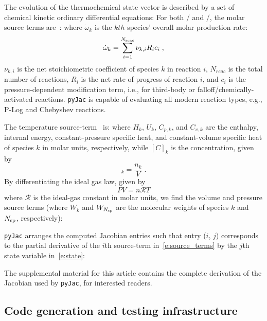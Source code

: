 \documentclass[12pt,number,sort&compress,preprint]{elsarticle}
\begin{document}
The evolution of the thermochemical state vector is described by a set of chemical kinetic ordinary differential equations:
For both \conp/ and \conv/, the molar source terms are~\cite{TurnsStephenR2012Aitc}:
where $\dot{\omega}_k$ is the $kth$ species' overall molar production rate:
\begin{equation}
 \dot{\omega}_{k} = \sum_{i=1}^{\nr/} \nu_{k, i} R_{i} c_{i} \;,
\end{equation}
$\nu_{k, i}$ is the net stoichiometric coefficient of species $k$ in reaction $i$, $N_{reac}$ is the total number of reactions, $R_{i}$ is the net rate of progress of reaction $i$, and $c_{i}$ is the pressure-dependent modification term, i.e., for third-body or falloff\slash chemically-activated reactions.
\texttt{pyJac} is capable of evaluating all modern reaction types, e.g., P-Log and Chebyshev reactions.

The temperature source-term~\cite{TurnsStephenR2012Aitc} is:
where $H_k$, $U_k$, $C_{p,k}$, and $C_{v, k}$ are the enthalpy, internal energy, constant-pressure specific heat, and constant-volume specific heat of species $k$ in molar units, respectively, while $[C]_{k}$ is the concentration, given by
\begin{equation}
 [C]_{k} = \frac{n_{k}}{V} \;.
\end{equation}
By differentiating the ideal gas law, given by
\begin{equation}
 PV = n\mathcal{R}T
\end{equation}
where $\mathcal{R}$ is the ideal-gas constant in molar units, we find the volume and pressure source terms (where $W_k$ and $W_{\ns/}$ are the molecular weights of species $k$ and $\ns/$, respectively):

\texttt{pyJac} arranges the computed Jacobian entries such that entry ($i$, $j$) corresponds to the partial derivative of the $i$th source-term in~\cref{e:source_terms} by the $j$th state variable in~\cref{e:state}:

The supplemental material for this article contains the complete derivation of the Jacobian used by \texttt{pyJac}, for interested readers.

\subsection{Code generation and testing infrastructure}
\label{s:unittest}
\end{document}
